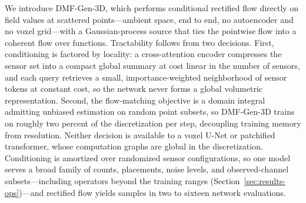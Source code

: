 \documentclass{article} %
\newcommand{\model}{DMF-Gen-3D}
\begin{document}
We introduce \model{}, which performs conditional rectified flow directly on field values at scattered points---ambient space, end to end, no autoencoder and no voxel grid---with a Gaussian-process source that ties the pointwise flow into a coherent flow over functions. Tractability follows from two decisions. First, conditioning is factored by locality: a cross-attention encoder compresses the sensor set into a compact global summary at cost linear in the number of sensors, and each query retrieves a small, importance-weighted neighborhood of sensor tokens at constant cost, so the network never forms a global volumetric representation. Second, the flow-matching objective is a domain integral admitting unbiased estimation on random point subsets, so \model{} trains on roughly two percent of the discretization per step, decoupling training memory from resolution. Neither decision is available to a voxel U-Net or patchified transformer, whose computation graphs are global in the discretization. Conditioning is amortized over randomized sensor configurations, so one model serves a broad family of counts, placements, noise levels, and observed-channel subsets---including operators beyond the training ranges (Section~\ref{sec:results-ops})---and rectified flow yields samples in two to sixteen network evaluations.
\end{document}
